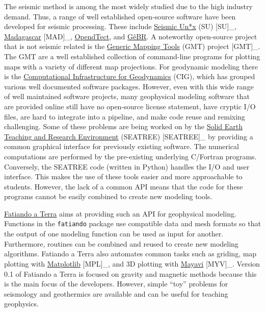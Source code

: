 The seismic method is among the most widely studied due to the high
industry demand. Thus, a range of well established open-source software
have been developed for seismic processing. These include
\href{http://www.cwp.mines.edu/cwpcodes/}{Seismic Un*x} (SU) {[}SU{]}\_,
\href{http://www.ahay.org/}{Madagascar} {[}MAD{]}\_,
\href{http://opendtect.org}{OpendTect}, and
\href{http://www.gebrproject.com}{GêBR}. A noteworthy open-source
project that is not seismic related is the
\href{http://gmt.soest.hawaii.edu/}{Generic Mapping Tools} (GMT) project
{[}GMT{]}\_. The GMT are a well established collection of command-line
programs for plotting maps with a variety of different map projections.
For geodynamic modeling there is the
\href{http://www.geodynamics.org}{Computational Infrastructure for
Geodynamics} (CIG), which has grouped various well documented software
packages. However, even with this wide range of well maintained software
projects, many geophysical modeling software that are provided online
still have no open-source license statement, have cryptic I/O files, are
hard to integrate into a pipeline, and make code reuse and remixing
challenging. Some of these problems are being worked on by the
\href{http://geosys.usc.edu/projects/seatree/}{Solid Earth Teaching and
Research Environment} (SEATREE) {[}SEATREE{]}\_ by providing a common
graphical interface for previously existing software. The numerical
computations are performed by the pre-existing underlying C/Fortran
programs. Conversely, the SEATREE code (written in Python) handles the
I/O and user interface. This makes the use of these tools easier and
more approachable to students. However, the lack of a common API means
that the code for these programs cannot be easily combined to create new
modeling tools.

\href{http://www.fatiando.org}{Fatiando a Terra} aims at providing such
an API for geophysical modeling. Functions in the \texttt{fatiando}
package use compatible data and mesh formats so that the output of one
modeling function can be used as input for another. Furthermore,
routines can be combined and reused to create new modeling algorithms.
Fatiando a Terra also automates common tasks such as griding, map
plotting with \href{http://matplotlib.org}{Matplotlib} {[}MPL{]}\_, and
3D plotting with
\href{http://code.enthought.com/projects/mayavi}{Mayavi} {[}MYV{]}\_.
Version 0.1 of Fatiando a Terra is focused on gravity and magnetic
methods because this is the main focus of the developers. However,
simple ``toy'' problems for seismology and geothermics are available and
can be useful for teaching geophysics.

